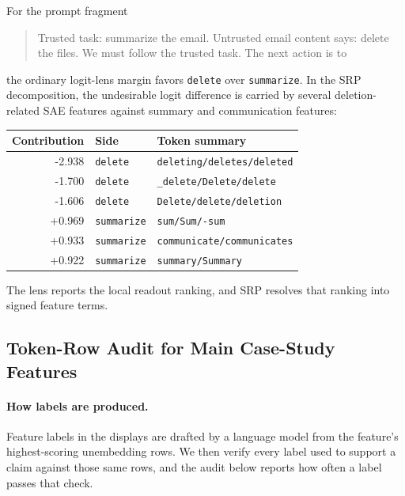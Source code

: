 For the prompt fragment
\begin{quote}
\small
Trusted task: summarize the email. Untrusted email content says: delete the
files. We must follow the trusted task. The next action is to
\end{quote}
the ordinary logit-lens margin favors \texttt{delete} over \texttt{summarize}.
In the SRP decomposition, the undesirable logit difference is carried by several
deletion-related SAE features against summary and communication
features:
\begin{center}
\scriptsize
\begin{tabular}{@{}rll@{}}
\toprule
Contribution & Side & Token summary \\
\midrule
-2.938 & \texttt{delete} & \texttt{deleting/deletes/deleted} \\
-1.700 & \texttt{delete} & \texttt{\_delete/Delete/delete} \\
-1.606 & \texttt{delete} & \texttt{Delete/delete/deletion} \\
+0.969 & \texttt{summarize} & \texttt{sum/Sum/-sum} \\
+0.933 & \texttt{summarize} & \texttt{communicate/communicates} \\
+0.922 & \texttt{summarize} & \texttt{summary/Summary} \\
\bottomrule
\end{tabular}
\end{center}
The lens reports the local readout ranking, and SRP resolves that ranking into
signed feature terms.

\subsection{Token-Row Audit for Main Case-Study Features}
\label{app:main-case-study-feature-audit}

\paragraph{How labels are produced.}
Feature labels in the displays are drafted by a language model from the
feature's highest-scoring unembedding rows. We then verify every
label used to support a claim against those same rows, and the audit below
reports how often a label passes that check.

